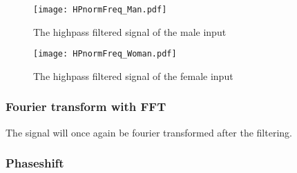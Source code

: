 \begin{figure}
\centering
\texttt{[image: HPnormFreq\_Man.pdf]}
\caption{The highpass filtered signal of the male input}
\label{fig:HPMAle}
\end{figure}

\begin{figure}
	\centering
	\texttt{[image: HPnormFreq\_Woman.pdf]}
	\caption{The highpass filtered signal of the female input}
	\label{fig:HPFemale}
\end{figure}




\subsubsection{Fourier transform with FFT}
The signal will once again be fourier transformed after the filtering. 



\subsubsection{Phaseshift}

